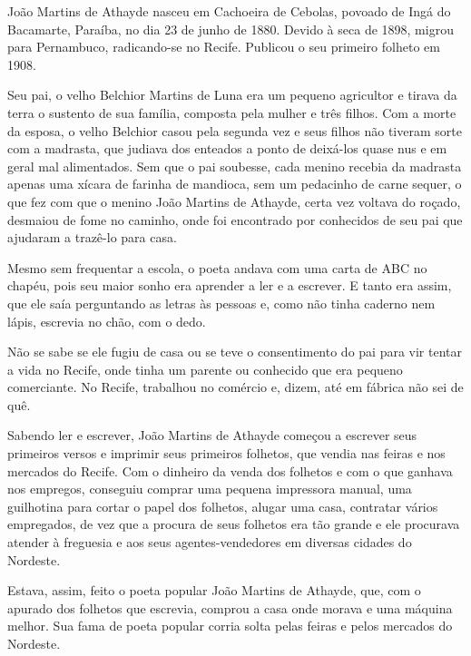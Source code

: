 \documentclass[12pt]{extarticle}
\begin{document}
João Martins de Athayde nasceu em Cachoeira de Cebolas, povoado de Ingá
do Bacamarte, Paraíba, no dia 23 de junho de 1880. Devido à seca de
1898, migrou para Pernambuco, radicando-se no Recife. Publicou o seu
primeiro folheto em 1908.


Seu pai, o velho Belchior Martins de Luna era um pequeno agricultor e
tirava da terra o sustento de sua família, composta pela mulher e três
filhos. Com a morte da esposa, o velho Belchior casou pela segunda vez e
seus filhos não tiveram sorte com a madrasta, que judiava dos enteados a
ponto de deixá-los quase nus e em geral mal alimentados. Sem que o pai
soubesse, cada menino recebia da madrasta apenas uma xícara de farinha
de mandioca, sem um pedacinho de carne sequer, o que fez com que o
menino João Martins de Athayde, certa vez voltava do roçado, desmaiou de
fome no caminho, onde foi encontrado por conhecidos de seu pai que
ajudaram a trazê-lo para casa.

Mesmo sem frequentar a escola, o poeta andava com uma carta de ABC no
chapéu, pois seu maior sonho era aprender a ler e a escrever. E tanto
era assim, que ele saía perguntando as letras às pessoas e, como não
tinha caderno nem lápis, escrevia no chão, com o dedo.

Não se sabe se ele fugiu de casa ou se teve o consentimento do pai para
vir tentar a vida no Recife, onde tinha um parente ou conhecido que era
pequeno comerciante. No Recife, trabalhou no comércio e, dizem, até em
fábrica não sei de quê.

Sabendo ler e escrever, João Martins de Athayde começou a escrever seus
primeiros versos e imprimir seus primeiros folhetos, que vendia nas
feiras e nos mercados do Recife. Com o dinheiro da venda dos folhetos e
com o que ganhava nos empregos, conseguiu comprar uma pequena impressora
manual, uma guilhotina para cortar o papel dos folhetos, alugar uma
casa, contratar vários empregados, de vez que a procura de seus folhetos
era tão grande e ele procurava atender à freguesia e aos seus
agentes-vendedores em diversas cidades do Nordeste.

Estava, assim, feito o poeta popular João Martins de Athayde, que, com o
apurado dos folhetos que escrevia, comprou a casa onde morava e uma
máquina melhor. Sua fama de poeta popular corria solta pelas feiras e
pelos mercados do Nordeste.
\end{document}
